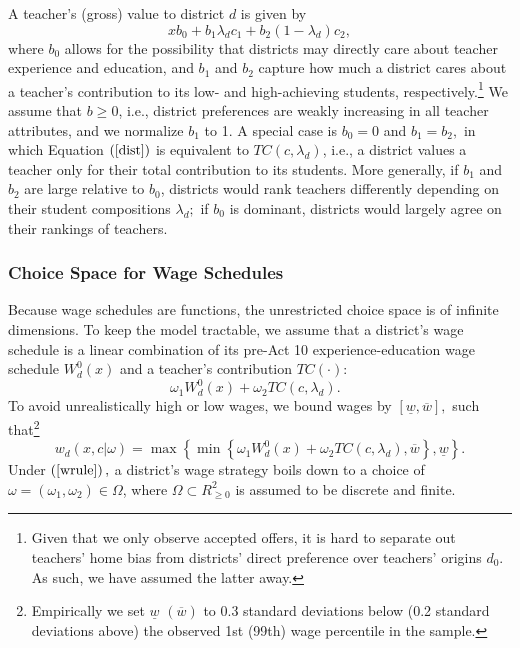 \documentclass[notitlepage,12pt]{article}%
\begin{document}
A teacher's (gross) value to district $d$ is given by
\begin{equation}
xb_{0}+b_{1}\lambda_{d}c_{1}+b_{2}\left(  1-\lambda_{d}\right)  c_{2},
\label{dist}%
\end{equation}
where $b_{0}$ allows for the possibility that districts may directly care
about teacher experience and education, and $b_{1}$ and $b_{2}$ capture how
much a district cares about a teacher's contribution to its low- and
high-achieving students, respectively.\footnote{Given that we only observe
accepted offers, it is hard to separate out teachers' home bias from
districts' direct preference over teachers' origins $d_{0}.$ As such, we have
assumed the latter away.} We assume that $b\geq0$, i.e., district preferences
are weakly increasing in all teacher attributes, and we normalize $b_{1}$ to
1. A special case is $b_{0}=0$ and $b_{1}=b_{2},$ in which Equation $\left(
\ref{dist}\right)  $ is equivalent to $TC\left(  c,\lambda_{d}\right)  $,
i.e., a district values a teacher only for their total contribution to its
students. More generally, if $b_{1}$ and $b_{2}$ are large relative to $b_{0}%
$, districts would rank teachers differently depending on their student
compositions $\lambda_{d};$ if $b_{0}$ is dominant, districts would largely
agree on their rankings of teachers.

\subsubsection{Choice Space for Wage Schedules}

Because wage schedules are functions, the unrestricted choice space is of
infinite dimensions. To keep the model tractable, we assume that a district's
wage schedule is a linear combination of its pre-Act 10 experience-education
wage schedule $W_{d}^{0}\left(  x\right)  $ and a teacher's contribution
$TC\left(  \cdot\right)  $:
\[
\omega_{1}W_{d}^{0}\left(  x\right)  +\omega_{2}TC\left(  c,\lambda
_{d}\right)  .\text{ }%
\]
To avoid unrealistically high or low wages, we bound wages by $\left[
\underline{w},\overline{w}\right]  ,$ such that\footnote{Empirically we set
$\underline{w}$ $\left(  \overline{w}\right)  $ to 0.3 standard deviations
below (0.2 standard deviations above) the observed 1st (99th) wage percentile
in the sample.}
\begin{equation}
w_{d}\left(  x,c|\omega\right)  =\max\left\{  \min\left\{  \omega_{1}W_{d}%
^{0}\left(  x\right)  +\omega_{2}TC\left(  c,\lambda_{d}\right)  ,\overline
{w}\right\}  ,\underline{w}\right\}  . \label{wrule}%
\end{equation}
Under $\left(  \ref{wrule}\right)  ,$ a district's wage strategy boils down to
a choice of $\omega=\left(  \omega_{1},\omega_{2}\right)  \in\Omega$, where
$\Omega\subset R_{\geq0}^{2}$ is assumed to be discrete and finite.
\end{document}
